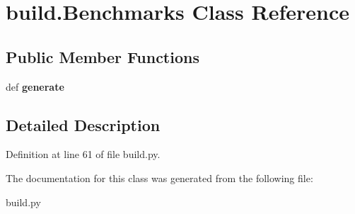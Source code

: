\hypertarget{classbuild_1_1Benchmarks}{\section{build.\-Benchmarks \-Class \-Reference}
\label{classbuild_1_1Benchmarks}
}
\subsection*{\-Public \-Member \-Functions}
\begin{DoxyCompactItemize}
\item 
\hypertarget{classbuild_1_1Benchmarks_a90444b5ee86805be3194ec86e41ee0a9}{def {\bfseries generate}}\label{classbuild_1_1Benchmarks_a90444b5ee86805be3194ec86e41ee0a9}

\end{DoxyCompactItemize}


\subsection{\-Detailed \-Description}


\-Definition at line 61 of file build.\-py.



\-The documentation for this class was generated from the following file\-:\begin{DoxyCompactItemize}
\item 
build.\-py\end{DoxyCompactItemize}
